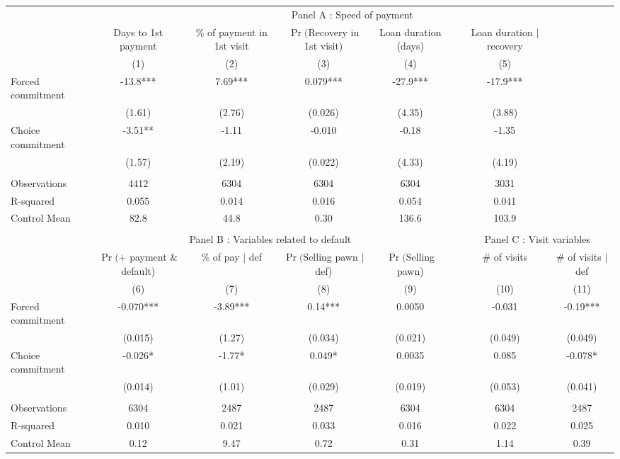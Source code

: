\begin{tabular}{lccccccc}
\toprule
      & \multicolumn{7}{c}{Panel A  : Speed of payment} \\
\cmidrule{2-8}      & Days to 1st payment & \% of payment in 1st visit & $\Pr($Recovery in 1st visit) & Loan duration (days) &       & Loan duration $|$ recovery &  \\
\cmidrule{1-5}\cmidrule{7-8}      & (1)   & (2)   & (3)   & (4)   &       & (5)   &  \\
\cmidrule{1-5}\cmidrule{7-8}Forced commitment & -13.8*** & 7.69*** & 0.079*** & -27.9*** &       & -17.9*** &  \\
      & (1.61) & (2.76) & (0.026) & (4.35) &       & (3.88) &  \\
Choice commitment & -3.51** & -1.11 & -0.010 & -0.18 &       & -1.35 &  \\
      & (1.57) & (2.19) & (0.022) & (4.33) &       & (4.19) &  \\
      &       &       &       &       &       &       &  \\
\cmidrule{1-5}\cmidrule{7-8}Observations & 4412  & 6304  & 6304  & 6304  &       & 3031  &  \\
R-squared & 0.055 & 0.014 & 0.016 & 0.054 &       & 0.041 &  \\
Control Mean & 82.8  & 44.8  & 0.30  & 136.6 &       & 103.9 &  \\
      &       &       &       &       &       &       &  \\
\midrule
      & \multicolumn{4}{c}{Panel B  : Variables related to default} &       & \multicolumn{2}{c}{Panel C  : Visit variables} \\
\cmidrule{2-8}      & $\Pr($+ payment \& default) & \% of pay $|$ def  & $\Pr($Selling pawn $|$ def) & $\Pr($Selling pawn) &       & \# of visits & \# of visits $|$ def \\
\midrule
\midrule
      & (6)   & (7)   & (8)   & (9)   &       & (10)  & (11) \\
\midrule
\midrule
Forced commitment & -0.070*** & -3.89*** & 0.14*** & 0.0050 &       & -0.031 & -0.19*** \\
      & (0.015) & (1.27) & (0.034) & (0.021) &       & (0.049) & (0.049) \\
Choice commitment & -0.026* & -1.77* & 0.049* & 0.0035 &       & 0.085 & -0.078* \\
      & (0.014) & (1.01) & (0.029) & (0.019) &       & (0.053) & (0.041) \\
      &       &       &       &       &       &       &  \\
\cmidrule{1-5}\cmidrule{7-8}Observations & 6304  & 2487  & 2487  & 6304  &       & 6304  & 2487 \\
R-squared & 0.010 & 0.021 & 0.033 & 0.016 &       & 0.022 & 0.025 \\
Control Mean & 0.12  & 9.47  & 0.72  & 0.31  &       & 1.14  & 0.39 \\
\bottomrule
\bottomrule
\end{tabular}%
